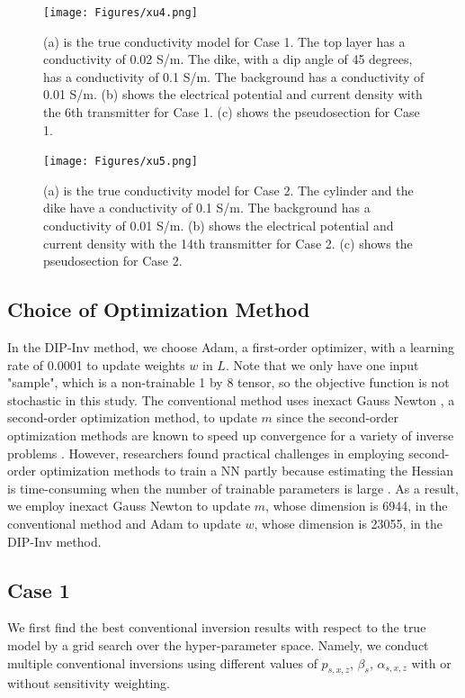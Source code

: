 \documentclass[lettersize,journal]{IEEEtran}
\begin{document}
\begin{figure}[h!]
\centering
\texttt{[image: Figures/xu4.png]}
\caption{(a) is the true conductivity model for Case 1. The top layer has a conductivity of 0.02 S/m. The dike, with a dip angle of 45 degrees, has a conductivity of 0.1 S/m. The background has a conductivity of 0.01 S/m. (b) shows the electrical potential and current density with the 6th transmitter for Case 1. (c) shows the pseudosection for Case 1.}
\label{fig3_1}
\end{figure}

\begin{figure}[h!]
\centering
\texttt{[image: Figures/xu5.png]}
\caption{(a) is the true conductivity model for Case 2. The cylinder and the dike have a conductivity of 0.1 S/m. The background has a conductivity of 0.01 S/m. (b) shows the electrical potential and current density with the 14th transmitter for Case 2. (c) shows the pseudosection for Case 2.}
\label{fig3_2}
\end{figure}

\subsection{Choice of Optimization Method}
\label{sec:3.2}
In the DIP-Inv method, we choose Adam, a first-order optimizer, with a learning rate of 0.0001 to update weights $w$ in $L$. Note that we only have one input "sample", which is a non-trainable 1 by 8 tensor, so the objective function is not stochastic in this study. The conventional method uses inexact Gauss Newton \cite{ref28}, a second-order optimization method, to update $m$ since the second-order optimization methods are known to speed up convergence for a variety of inverse problems \cite{ref5}. However, researchers found practical challenges in employing second-order optimization methods to train a NN partly because estimating the Hessian is time-consuming when the number of trainable parameters is large \cite{ref10}. As a result, we employ inexact Gauss Newton to update $m$, whose dimension is 6944, in the conventional method and Adam to update $w$, whose dimension is 23055, in the DIP-Inv method. 
 
\subsection{Case 1}
\label{sec:3.3}
We first find the best conventional inversion results with respect to the true model by a grid search over the hyper-parameter space. Namely, we conduct multiple conventional inversions using different values of  $p_{s,x,z}$, $\beta_s$, $\alpha_{s,x,z}$ with or without sensitivity weighting. 
\end{document}
